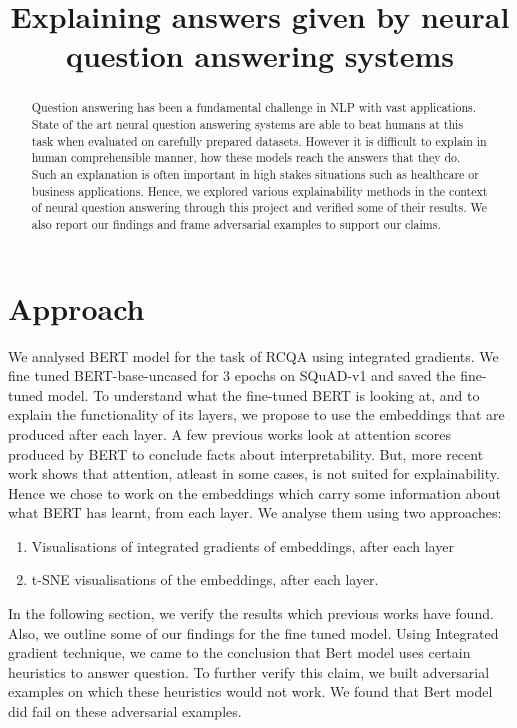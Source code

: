 \documentclass[10pt,twocolumn,letterpaper]{article}
\begin{document}
\title{Explaining answers given by neural question answering systems}
\maketitle

\begin{abstract}
Question answering has been a fundamental challenge in NLP with vast applications. State of the art neural question answering systems are able to beat humans at this task when evaluated on carefully prepared datasets. However it is difficult to explain in human comprehensible manner, how these models reach the answers that they do. Such an explanation is often important in high stakes situations such as healthcare or business applications. Hence, we explored various explainability methods in the context of neural question answering through this project and verified some of their results. We also report our findings and frame adversarial examples to support our claims.
\end{abstract}

\section{Approach}
We analysed BERT model for the task of RCQA using integrated gradients. We fine tuned BERT-base-uncased for 3 epochs on SQuAD-v1 and saved the fine-tuned model. To understand what the fine-tuned BERT is looking at, and to explain the functionality of its layers, we propose to use the embeddings that are produced after each layer. A few previous works look at attention scores produced by BERT to conclude facts about interpretability. But, more recent work \cite{at_not_exp} shows that attention, atleast in some cases, is not suited for explainability. Hence we chose to work on the embeddings which carry some information about what BERT has learnt, from each layer. We analyse them using two approaches:
\begin{enumerate}
    \item Visualisations of integrated gradients of embeddings, after each layer
    \item t-SNE visualisations of the embeddings, after each layer.
\end{enumerate}
In the following section, we verify the results which previous works have found. Also, we outline some of our findings for the fine tuned model. Using Integrated gradient technique, we came to the conclusion that Bert model uses certain heuristics to answer question. To further verify this claim, we built adversarial examples on which these heuristics would not work. We found that Bert model did fail on these adversarial examples.
\end{document}
